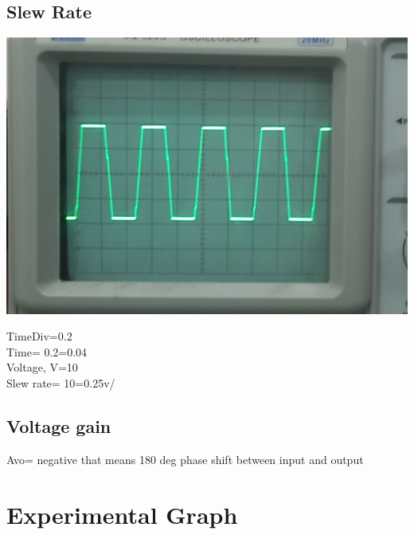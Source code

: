 \documentclass[12pt]{article}
\begin{document}
\subsection{Slew Rate}
\begin{center}
    \includegraphics[scale=.09]{20220831_113137.jpg}
\end{center}
Time\div Div=0.2\\
Time= 0.2=0.04\\
Voltage, V=10\\
Slew rate= 10=0.25v/\\
\subsection{Voltage gain}
Avo= negative that means 180 deg phase shift between input and output\\
\section{Experimental Graph}\\
\end{document}
